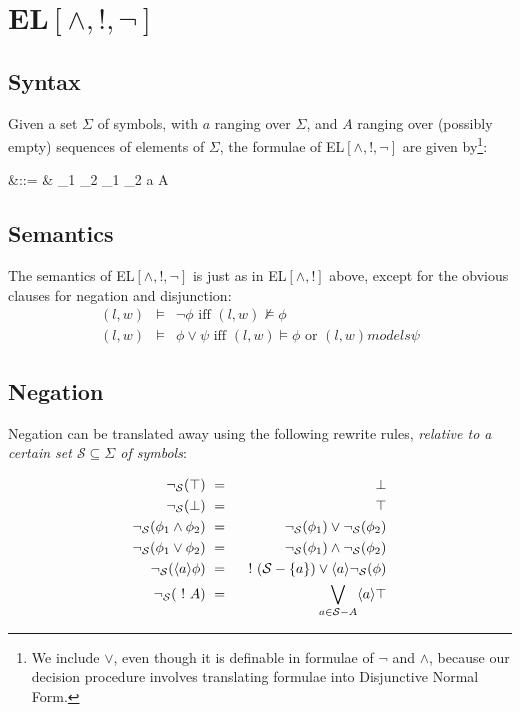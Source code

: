 \section{EL$[\land, !, \neg]$}


\subsection{Syntax}

Given a set $\Sigma$ of symbols, with $a$ ranging over
$\Sigma$, and $A$ ranging over (possibly empty) sequences of
elements of $\Sigma$, the formulae of EL$[\land, !, \neg]$ are
given by\footnote{We include $\lor$, even though it is definable in
formulae of $\neg$ and $\land$, because our decision procedure involves
translating formulae into Disjunctive Normal Form.}:

\begin{GRAMMAR}
  \phi 
     &\quad ::= \quad & 
   \top \fOr \bot \fOr \neg \phi \fOr \phi_1 \land \phi_2 \fOr\phi_1 \lor \phi_2 \fOr \langle a \rangle \phi \fOr \fBang A 
\end{GRAMMAR}

\subsection{Semantics}

The semantics of EL$[\land, !, \neg]$ is just as in EL$[\land, !]$
above, except for the obvious clauses for negation and disjunction:
\begin{eqnarray*}
(l,w) & \models & \neg \phi \mbox{ iff } (l,w) \nvDash \phi \\
(l,w) & \models & \phi \lor \psi \mbox{ iff } (l,w) \models \phi \text{ or }   (l,w) models \psi
\end{eqnarray*}

\subsection{Negation}

Negation can be translated away using the following rewrite rules,
\emph{relative to a certain set $\mathcal{S} \subseteq \Sigma$ of symbols}:

\begin{eqnarray*}
  \neg_{\mathcal{S}}(\top) & \ = \ & \bot  \\
  \neg_\mathcal{S}(\bot) & \ = \ & \top  \\
  \neg_\mathcal{S}(\phi_1 \land \phi_2) & \ = \ & \neg_\mathcal{S}(\phi_1) \lor \neg_\mathcal{S}(\phi_2)  \\
  \neg_\mathcal{S}(\phi_1 \lor \phi_2) & \ = \ & \neg_\mathcal{S}(\phi_1) \land \neg_\mathcal{S}(\phi_2)  \\
  \neg_\mathcal{S}(\langle a \rangle \phi) & \ = \ & \ ! \ (\mathcal{S}-\{a\}) \lor \langle a \rangle \neg_\mathcal{S}(\phi)  \\
  \neg_\mathcal{S}(\ ! \  A) & \ = \ & \bigvee_{a \in \mathcal{S} - A} \langle a \rangle \top
\end{eqnarray*}

